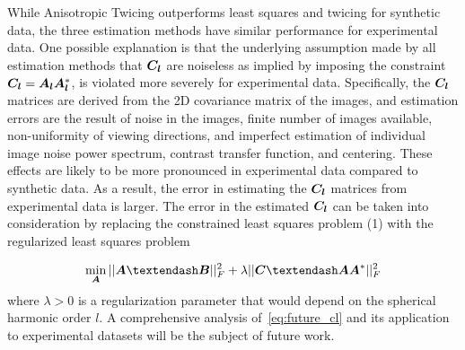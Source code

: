 While Anisotropic Twicing outperforms least squares and twicing for synthetic data, the three estimation methods have similar performance for experimental data. One possible explanation is that the underlying assumption made by all estimation methods that $\boldsymbol{C}_{\boldsymbol{l}}$ are noiseless as implied by imposing the constraint $\boldsymbol{C}_{\boldsymbol{l}}=\boldsymbol{A}_{\boldsymbol{l}} \boldsymbol{A}_{\boldsymbol{l}}^*$, is violated more severely for experimental data. Specifically, the $\boldsymbol{C}_{\boldsymbol{l}}$ matrices are derived from the 2D covariance matrix of the images, and estimation errors are the result of noise in the images, finite number of images available, non-uniformity of viewing directions, and imperfect estimation of individual image noise power spectrum, contrast transfer function, and centering. These effects are likely to be more pronounced in experimental data compared to synthetic data. As a result, the error in estimating the $\boldsymbol{C}_{\boldsymbol{l}}$ matrices from experimental data is larger. The error in the estimated $\boldsymbol{C}_{\boldsymbol{l}}$ can be taken into consideration by replacing the constrained least squares problem (1) with the regularized least squares problem
 
\begin{equation}\label{eq:future_cl}
\min_{\bA} ||\bA – \bB||_F^2 + \lambda||\bC – \bA\bA^*||_F^2
\end{equation}
where $\lambda>0$ is a regularization parameter that would depend on the spherical harmonic order $l$. A comprehensive analysis of~\eqref{eq:future_cl} and its application to experimental datasets will be the subject of future work.     
 